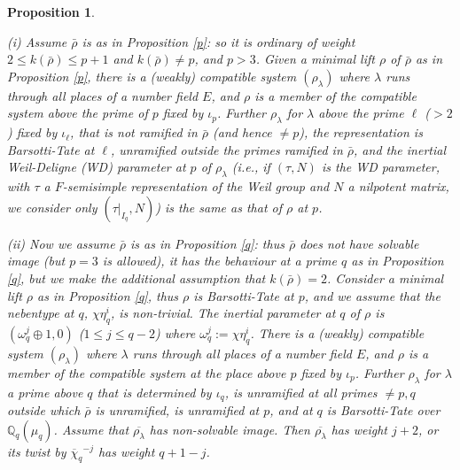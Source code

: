 \documentclass[12pt]{amsart}
\newcommand{\Q}{\mathbb{Q}}
\newcommand{\rhobar}{\overline{\rho}}
\newtheorem{prop}[theorem]{Proposition}
\def\rhobar{ {\bar {\rho} } }
\def\rhob{ {\bar {\rho} } }
\begin{document}
\begin{prop}\label{c}
 
(i)  Assume $\rhobar$ is as in Proposition \ref{p}: so it is ordinary of weight $2 \leq k(\rhobar) \leq p+1$ and $k(\rhobar) \neq p$, and $p>3$.
Given a minimal lift $\rho$  of $\rhobar$ as in Proposition \ref{p}, there is a
(weakly) compatible system $(\rho_{\lambda})$ where $\lambda$ runs through all
places of a number field $E$, and $\rho$ is a member of the
compatible system above the prime of $p$ fixed by $\iota_p$. Further 
$\rho_{\lambda}$ for $\lambda$ above the prime $\ell$ ($>2$) fixed by $\iota_\ell$, that is not ramified in $\rhobar$ (and hence $\neq p$), 
the representation is Barsotti-Tate at $\ell$, unramified outside the primes ramified in $\rhobar$, and 
the inertial Weil-Deligne (WD) parameter at $p$ of $\rho_{\lambda}$ 
(i.e., if $(\tau,N)$ is the WD parameter, with $\tau$ a $F$-semisimple representation of the Weil group and $N$ 
a nilpotent matrix, we consider only $(\tau|_{I_q},N)$) is the same as that of
$\rho$ at $p$.
 
(ii) Now we assume $\rhob$ is as in Proposition \ref{q}: thus 
$\rhobar$ does not have solvable image (but $p=3$ is allowed), it has the behaviour at a prime $q$ as in  Proposition \ref{q}, but we make the additional assumption that 
$k(\rhobar)=2$. 
Consider a minimal lift $\rho$ as in Proposition \ref{q}, thus $\rho$
is Barsotti-Tate at $p$, and we assume that the nebentype at $q$, 
$\chi\eta_q^i$, is non-trivial. The inertial parameter at $q$ of $\rho$ is $(\omega_q^j \oplus 1,0)$ ($ 1 \leq j \leq q-2$) where 
$\omega_q^j:=\chi\eta_q^i$. There is a (weakly) compatible system $(\rho_{\lambda})$ where $\lambda$ runs
through all places of a number field $E$, and $\rho$ is a member of
the compatible system at the place above  $p$ fixed by $\iota_p$. Further $\rho_{\lambda}$ for
$\lambda$ a prime above $q$ that is determined by $\iota_q$, is unramified at all primes $\neq
p,q$ outside which $\rhobar$ is unramified, is unramified at $p$, and at $q$
is Barsotti-Tate over $\Q_q(\mu_q)$.  Assume that $\overline{\rho_\lambda}$
has non-solvable image. Then $\overline{\rho_\lambda}$ has weight $j+2$, 
or its twist by ${\overline \chi_q}^{-j}$
has weight $q+1-j$. 
\end{prop}
\end{document}
